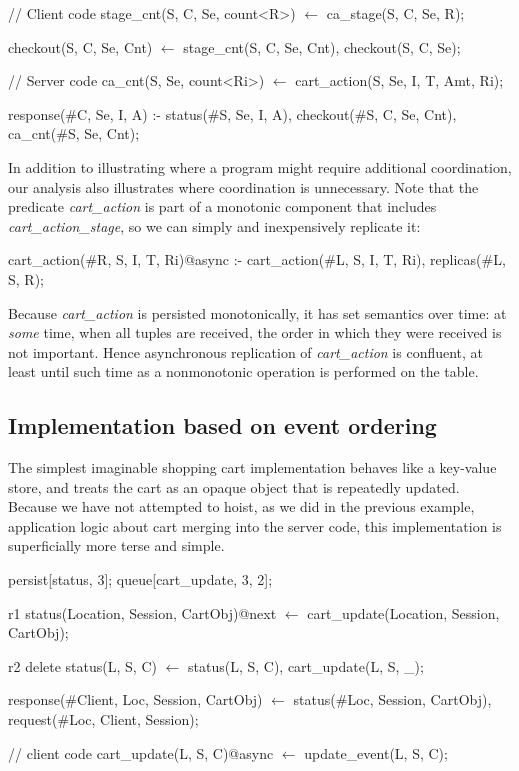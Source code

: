 \begin{Dedalus}
// Client code
stage_cnt(S, C, Se, count<R>) \(\leftarrow\)
  ca_stage(S, C, Se, R);

checkout(S, C, Se, Cnt) \(\leftarrow\)
  stage_cnt(S, C, Se, Cnt),
  checkout(S, C, Se);

// Server code
ca_cnt(S, Se, count<Ri>) \(\leftarrow\) 
  cart_action(S, Se, I, T, Amt, Ri);

response(#C, Se, I, A) :-
  status(#S, Se, I, A), 
  checkout(#S, C, Se, Cnt),
  ca_cnt(#S, Se, Cnt);

\end{Dedalus}


In addition to illustrating where a program might require additional coordination, our
analysis also illustrates where coordination is unnecessary.
Note that the predicate {\em cart\_action} is part of a monotonic component that includes {\em cart\_action\_stage}, 
so we can simply and inexpensively replicate it:

\begin{Dedalus}
cart_action(#R, S, I, T, Ri)@async :-
    cart_action(#L, S, I, T, Ri),
    replicas(#L, S, R);
\end{Dedalus}

Because {\em cart\_action} is persisted monotonically, it has set semantics over time: at
{\em some} time, when all tuples are received, the order in which they were received is
not important.  Hence asynchronous replication of {\em cart\_action} is confluent,
at least until such time as a nonmonotonic operation is performed on the table.


\subsection{Implementation based on event ordering}

The simplest imaginable shopping cart implementation behaves like a key-value store,
and treats the cart as an opaque object that is repeatedly updated.    Because we have not
attempted to hoist, as we did in the previous example, application logic about cart merging
into the server code, this implementation is superficially more terse and simple.

\begin{Dedalus}
persist[status, 3];
queue[cart_update, 3, 2];

r1
status(Location, Session, CartObj)@next \(\leftarrow\)
    cart_update(Location,  Session, CartObj);
    
r2
delete status(L, S, C) \(\leftarrow\)
    status(L, S, C), cart_update(L, S, _);
  
response(#Client, Loc, Session, CartObj) \(\leftarrow\)
    status(#Loc, Session, CartObj),
    request(#Loc, Client, Session);

// client code
cart_update(L, S, C)@async \(\leftarrow\) 
    update_event(L, S, C);
\end{Dedalus}

